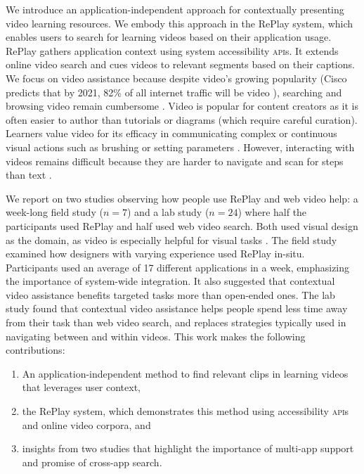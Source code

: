 We introduce an application-independent approach for contextually presenting video learning resources. We embody this approach in the RePlay system, which enables users to search for learning videos based on their application usage. RePlay gathers application context using system accessibility \textsc{api}s. It extends online video search and cues videos to relevant segments based on their captions. We focus on video assistance because despite video's growing popularity (Cisco predicts that by 2021, 82\% of all internet traffic will be video \cite{Cisco}), searching and browsing video remain cumbersome \cite{Kim2014, Pavel2014, Pavel2015}. Video is popular for content creators as it is often easier to author than tutorials or diagrams (which require careful curation). Learners value video for its efficacy in communicating complex or continuous visual actions such as brushing or setting parameters \cite{Chi2012}. However, interacting with videos remains difficult because they are harder to navigate and scan for steps than text \cite{Chi2012}.


We report on two studies observing how people use RePlay and web video help: a week-long field study ($n\!=\!7$) and a lab study ($n\!=\!24$) where half the participants used RePlay and half used web video search. Both used visual design as the domain, as video is especially helpful for visual tasks \cite{Pongnumkul2011}. The field study examined how designers with varying experience used RePlay in-situ. Participants used an average of 17 different applications in a week, emphasizing the importance of system-wide integration. It also suggested that contextual video assistance benefits targeted tasks more than open-ended ones. The lab study found that contextual video assistance helps people spend less time away from their task than web video search, and replaces strategies typically used in navigating between and within videos. This work makes the following contributions:

\begin{enumerate}
    \item An application-independent method to find relevant clips in learning videos that leverages user context,
    \item the RePlay system, which demonstrates this method using accessibility \textsc{api}s and online video corpora, and
    \item insights from two studies that highlight the importance of multi-app support and promise of cross-app search.
\end{enumerate}




